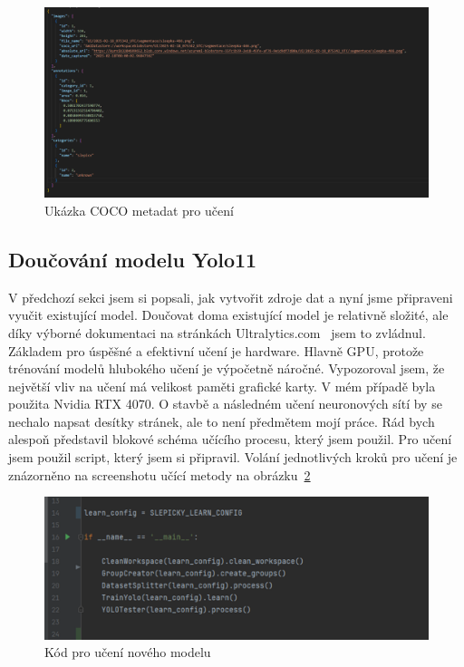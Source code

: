 \begin{figure}[htbp]
    \centering
    \includegraphics[width=1.0\textwidth]{img/coco_format}
    \caption{Ukázka COCO metadat pro učení}
    \label{fig:coco_format}
\end{figure}

\subsection*{Doučování modelu Yolo11}\label{subsec:doucovani-modelu-yolov11-o-novou-tridu}
V předchozí sekci jsem si popsali, jak vytvořit zdroje dat a nyní jsme připraveni vyučit existující model.
Doučovat doma existující model je relativně složité, ale díky výborné dokumentaci na stránkách Ultralytics.com~\cite{ultralytics} jsem to zvládnul.
Základem pro úspěšné a efektivní učení je hardware.
Hlavně GPU, protože trénování modelů hlubokého učení je výpočetně náročné.
Vypozoroval jsem, že největší vliv na učení má velikost paměti grafické karty.
V mém případě byla použita Nvidia RTX 4070.
O stavbě a následném učení neuronových sítí by se nechalo napsat desítky stránek, ale to není předmětem mojí práce.
Rád bych alespoň představil blokové schéma učícího procesu, který jsem použil.\newline
\newline
Pro učení jsem použil script, který jsem si připravil.
Volání jednotlivých kroků pro učení je znázorněno na screenshotu učící metody na obrázku~\ref{fig:learn_script}

\begin{figure}[htbp]
    \centering
    \includegraphics[width=1.0\textwidth]{img/learn_script}
    \caption{Kód pro učení nového modelu}
    \label{fig:learn_script}
\end{figure}


